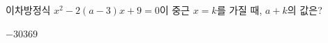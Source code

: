 이차방정식 $x^2-2(a-3)x+9=0$이 중근 $x=k$를 가질 때, $a+k$의 값은? 
\begin{choices32}{$-3$}{$0$}{$3$}{$6$}{$9$}\end{choices32}
